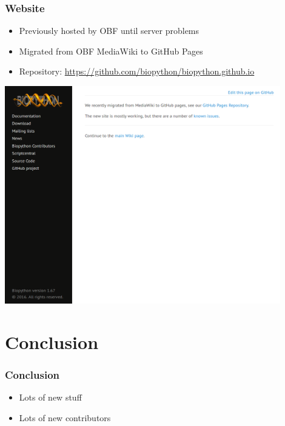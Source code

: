 \documentclass[trans]{beamer}
\begin{document}
\frame
{
  \frametitle{Website}

  \begin{itemize}
  \item Previously hosted by OBF until server problems
  \item Migrated from OBF MediaWiki to GitHub Pages
  \item Repository: \url{https://github.com/biopython/biopython.github.io}
  \end{itemize}

  \begin{center}
  \includegraphics[width=0.9\textwidth]{bp-website.png}
  \end{center}
}


\section{Conclusion}
\frame
{
  \frametitle{Conclusion}

  \begin{itemize}
  \item Lots of new stuff
  \item Lots of new contributors
  \end{itemize}
}
\end{document}
